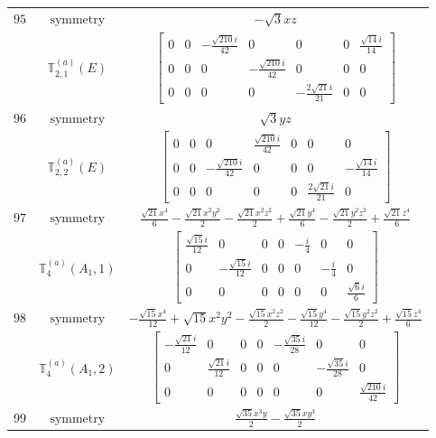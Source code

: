 \documentclass[fleqn,8pt,landscape]{jsarticle}
\begin{document}
\begin{longtable}{ccc}
$ 95 $ & $ \text{symmetry} $ & $ - \sqrt{3} x z $ \\
$  $ & $ \mathbb{T}_{2,1}^{(a)}(E) $ & $ \begin{bmatrix} 0 & 0 & - \frac{\sqrt{210} i}{42} & 0 & 0 & 0 & \frac{\sqrt{14} i}{14} \\ 0 & 0 & 0 & - \frac{\sqrt{210} i}{42} & 0 & 0 & 0 \\ 0 & 0 & 0 & 0 & - \frac{2 \sqrt{21} i}{21} & 0 & 0 \end{bmatrix} $ \\ \hline
$ 96 $ & $ \text{symmetry} $ & $ \sqrt{3} y z $ \\
$  $ & $ \mathbb{T}_{2,2}^{(a)}(E) $ & $ \begin{bmatrix} 0 & 0 & 0 & \frac{\sqrt{210} i}{42} & 0 & 0 & 0 \\ 0 & 0 & - \frac{\sqrt{210} i}{42} & 0 & 0 & 0 & - \frac{\sqrt{14} i}{14} \\ 0 & 0 & 0 & 0 & 0 & \frac{2 \sqrt{21} i}{21} & 0 \end{bmatrix} $ \\ \hline
$ 97 $ & $ \text{symmetry} $ & $ \frac{\sqrt{21} x^{4}}{6} - \frac{\sqrt{21} x^{2} y^{2}}{2} - \frac{\sqrt{21} x^{2} z^{2}}{2} + \frac{\sqrt{21} y^{4}}{6} - \frac{\sqrt{21} y^{2} z^{2}}{2} + \frac{\sqrt{21} z^{4}}{6} $ \\
$  $ & $ \mathbb{T}_{4}^{(a)}(A_{1},1) $ & $ \begin{bmatrix} \frac{\sqrt{15} i}{12} & 0 & 0 & 0 & - \frac{i}{4} & 0 & 0 \\ 0 & - \frac{\sqrt{15} i}{12} & 0 & 0 & 0 & - \frac{i}{4} & 0 \\ 0 & 0 & 0 & 0 & 0 & 0 & \frac{\sqrt{6} i}{6} \end{bmatrix} $ \\ \hline
$ 98 $ & $ \text{symmetry} $ & $ - \frac{\sqrt{15} x^{4}}{12} + \sqrt{15} x^{2} y^{2} - \frac{\sqrt{15} x^{2} z^{2}}{2} - \frac{\sqrt{15} y^{4}}{12} - \frac{\sqrt{15} y^{2} z^{2}}{2} + \frac{\sqrt{15} z^{4}}{6} $ \\
$  $ & $ \mathbb{T}_{4}^{(a)}(A_{1},2) $ & $ \begin{bmatrix} - \frac{\sqrt{21} i}{12} & 0 & 0 & 0 & - \frac{\sqrt{35} i}{28} & 0 & 0 \\ 0 & \frac{\sqrt{21} i}{12} & 0 & 0 & 0 & - \frac{\sqrt{35} i}{28} & 0 \\ 0 & 0 & 0 & 0 & 0 & 0 & \frac{\sqrt{210} i}{42} \end{bmatrix} $ \\ \hline
$ 99 $ & $ \text{symmetry} $ & $ \frac{\sqrt{35} x^{3} y}{2} - \frac{\sqrt{35} x y^{3}}{2} $ \\

\end{longtable}
\end{document}
